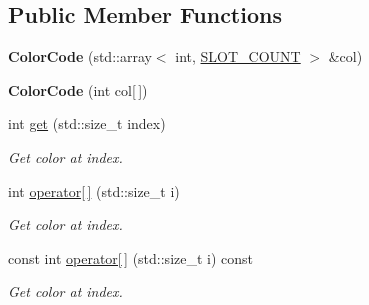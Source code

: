 \subsection*{Public Member Functions}
\begin{DoxyCompactItemize}
\item 
\hypertarget{classmastermind_1_1logic_1_1_color_code_abcbc2b11eac727d545b8a4dcec833054}{}\label{classmastermind_1_1logic_1_1_color_code_abcbc2b11eac727d545b8a4dcec833054} 
{\bfseries Color\+Code} (std\+::array$<$ int, \hyperlink{classmastermind_1_1_mastermind_ad4cfc8127641ff8dfe89d65ae232331c}{S\+L\+O\+T\+\_\+\+C\+O\+U\+NT} $>$ \&col)
\item 
\hypertarget{classmastermind_1_1logic_1_1_color_code_ac94a451ad586fc094994d647cf0ae516}{}\label{classmastermind_1_1logic_1_1_color_code_ac94a451ad586fc094994d647cf0ae516} 
{\bfseries Color\+Code} (int col\mbox{[}$\,$\mbox{]})
\item 
\hypertarget{classmastermind_1_1logic_1_1_color_code_a095c8e37b19f67c219ac674cc0948d41}{}\label{classmastermind_1_1logic_1_1_color_code_a095c8e37b19f67c219ac674cc0948d41} 
int \hyperlink{classmastermind_1_1logic_1_1_color_code_a095c8e37b19f67c219ac674cc0948d41}{get} (std\+::size\+\_\+t index)
\begin{DoxyCompactList}\small\item\em Get color at index. \end{DoxyCompactList}\item 
\hypertarget{classmastermind_1_1logic_1_1_color_code_aedd9c310464f3f073a83cd7685579eed}{}\label{classmastermind_1_1logic_1_1_color_code_aedd9c310464f3f073a83cd7685579eed} 
int \hyperlink{classmastermind_1_1logic_1_1_color_code_aedd9c310464f3f073a83cd7685579eed}{operator\mbox{[}$\,$\mbox{]}} (std\+::size\+\_\+t i)
\begin{DoxyCompactList}\small\item\em Get color at index. \end{DoxyCompactList}\item 
\hypertarget{classmastermind_1_1logic_1_1_color_code_a1a6b2570288147869f1e1116968d6909}{}\label{classmastermind_1_1logic_1_1_color_code_a1a6b2570288147869f1e1116968d6909} 
const int \hyperlink{classmastermind_1_1logic_1_1_color_code_a1a6b2570288147869f1e1116968d6909}{operator\mbox{[}$\,$\mbox{]}} (std\+::size\+\_\+t i) const
\begin{DoxyCompactList}\small\item\em Get color at index. \end{DoxyCompactList}\item 

\end{DoxyCompactItemize}
